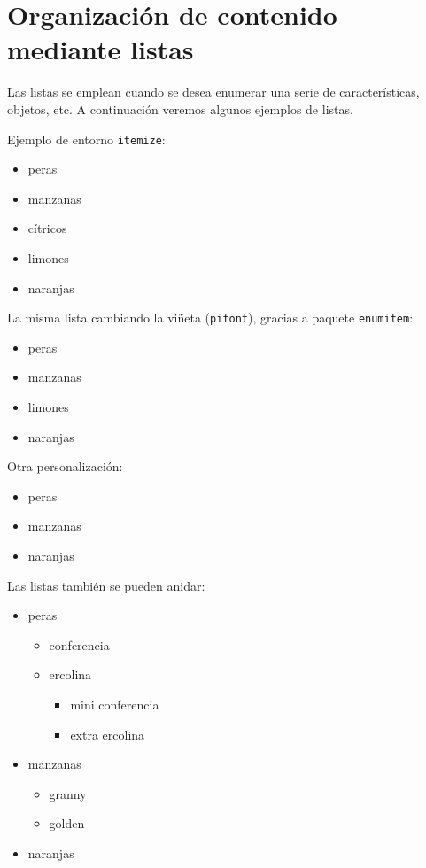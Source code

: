 \section{Organización de contenido mediante listas}
\label{sec:listas} %


Las listas se emplean cuando se desea enumerar una serie de características, objetos, etc. A continuación veremos algunos ejemplos de listas.

\noindent Ejemplo de entorno {\tt itemize}:

\begin{itemize}
	\item peras
	\item manzanas
    \item cítricos
        \item limones
        \item naranjas
\end{itemize}

\noindent La misma lista cambiando la viñeta (\texttt{pifont}), gracias a paquete \texttt{enumitem}:

\begin{itemize}[]
\item peras
\item[\faIcon{apple}] manzanas
\item limones
\item naranjas
\end{itemize}

\noindent Otra personalización:
\begin{itemize}[,noitemsep] %
	\item peras
	\item[\ding{55}] manzanas
	\item naranjas
\end{itemize}

\noindent Las listas también se pueden anidar:
\begin{itemize}
	\item peras
	\begin{itemize}
		\item conferencia
		\item ercolina
    	\begin{itemize}
    		\item mini conferencia
    		\item extra ercolina
    	\end{itemize}
	\end{itemize}
	\item manzanas
	\begin{itemize}
		\item granny
		\item golden 
	\end{itemize}
	\item naranjas
\end{itemize}

